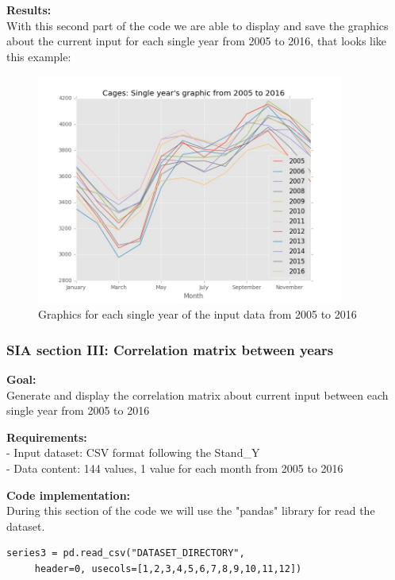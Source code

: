 \begin{minipage}{0.5\textwidth}
\textbf{Results:} \\
With this second part of the code we are able to display and save the graphics about the current input for each single year from 2005 to 2016, that looks like this example:
\end{minipage} \hfill
\begin{minipage}{0.45\textwidth}
\begin{figure}[H]
    \includegraphics[width=0.9\textwidth]{Files/Cages_Years.jpg}
    \caption{Graphics for each single year of the input data from 2005 to 2016}
\end{figure}
\end{minipage}



\newpage
\subsubsection{SIA section III: Correlation matrix between years}

\textbf{Goal:}\\
Generate and display the correlation matrix about current input between each single year from 2005 to 2016

\textbf{Requirements:}\\
- Input dataset: CSV format following the Stand\_Y \\
- Data content: 144 values, 1 value for each month from 2005 to 2016

\textbf{Code implementation:}\\
During this section of the code we will use the "pandas" library for read the dataset.
\begin{lstlisting}
series3 = pd.read_csv("DATASET_DIRECTORY",
	 header=0, usecols=[1,2,3,4,5,6,7,8,9,10,11,12])
\end{lstlisting}

